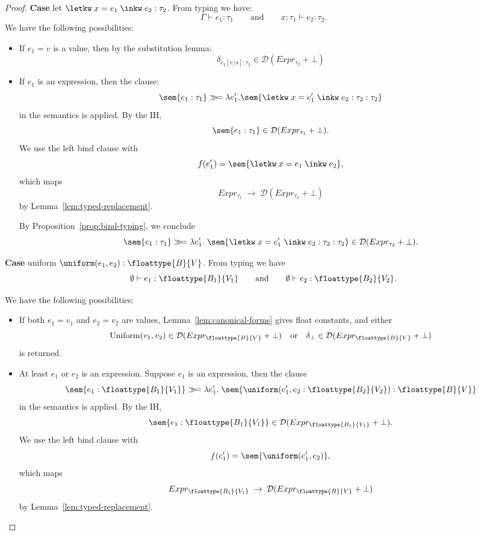\begin{proof}
		\textbf{Case} let $\letkw \; x = e_1 \; \inkw \; e_2 : \tau_2$. From typing we have:
		\[
			\Gamma \vdash e_1 : \tau_1 
			\qquad\text{and}\qquad 
			x : \tau_1 \vdash e_2 : \tau_2.
		\]
		We have the following possibilities:
		\begin{itemize}
			\item If $e_1 = v$ is a value, then by the substitution lemma:
			\[
				\delta_{e_2[v/x] : \tau_2} \in \mathcal{D}(Expr_{\tau_2} + \bot)
			\]
			\item If $e_1$ is an expression, then the clause:
			\[
				\sem{e_1 : \tau_1} \gg\!= \lambda e_1'.\sem{\letkw \; x = e_1' \; \inkw \; e_2 : \tau_2 : \tau_2}
			\]
			in the semantics is applied. By the IH,
			\[
				\sem{e_1 : \tau_1} \in \mathcal{D}(Expr_{\tau_1} + \bot).
			\]
			We use the left bind clause with 
			\[
				f(e_1') = \sem{\letkw \; x = e_1 \; \inkw \; e_2},
			\]
			which maps
			\[
				Expr_{\tau_1} \;\to\; \mathcal{D}(Expr_{\tau_2} + \bot)
			\]
			by Lemma~\ref{lem:typed-replacement}.

			By Proposition~\ref{prop:bind-typing}, we conclude
			\[
				\sem{e_1 : \tau_1} \gg\!= \lambda e_1'.\;
				\sem{\letkw \; x = e_1' \; \inkw \; e_2 : \tau_2 : \tau_2} \in \mathcal{D}(Expr_{\tau_2} + \bot).
			\]
		\end{itemize}

		\textbf{Case} uniform $\uniform(e_1,e_2) : \floattype{B}{V}$. 
		From typing we have 
		\[
		\emptyset \vdash e_1 : \floattype{B_1}{V_1} 
		\qquad\text{and}\qquad 
		\emptyset \vdash e_2 : \floattype{B_2}{V_2}.
		\]

		We have the following possibilities:
		\begin{itemize}
		\item If both $e_1 = v_1$ and $e_2 = v_2$ are values, Lemma~\ref{lem:canonical-forms} gives float constants, and either
		\[
			\text{Uniform}(v_1,v_2) \in \mathcal{D}(Expr_{\floattype{B}{V}} + \bot) 
			\quad\text{or}\quad
			\delta_{\bot} \in \mathcal{D}(Expr_{\floattype{B}{V}} + \bot)
		\]
		is returned.

		\item At least $e_1$ or $e_2$ is an expression. 
		Suppose $e_1$ is an expression, then the clause
		\[
			\sem{e_1 : \floattype{B_1}{V_1}} \gg\!= \lambda e_1'.\;
			\sem{\uniform(e_1',e_2 : \floattype{B_2}{V_2}) : \floattype{B}{V}}
		\]
		in the semantics is applied. By the IH,
		\[
			\sem{e_1 : \floattype{B_1}{V_1}} \in \mathcal{D}(Expr_{\floattype{B_1}{V_1}} + \bot).
		\]
		We use the left bind clause with 
		\[
			f(e_1') = \sem{\uniform(e_1',e_2)},
		\]
		which maps
		\[
			Expr_{\floattype{B_1}{V_1}} \;\to\; \mathcal{D}(Expr_{\floattype{B}{V}} + \bot)
		\]
		by Lemma~\ref{lem:typed-replacement}.


\end{itemize}
\end{proof}
